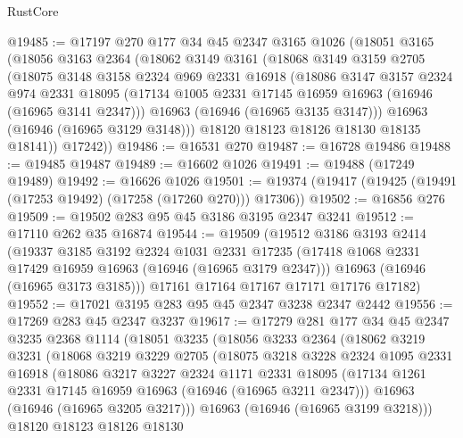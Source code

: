 \begin{lexlean}{RustCore}
\begin{coremodule}
@19485 := @17197
    @270
    @177
    @34
    @45
    @2347
    @3165
    @1026
    (@18051
      @3165
      (@18056
        @3163
        @2364
        (@18062
          @3149
          @3161
          (@18068
            @3149
            @3159
            @2705
            (@18075
              @3148
              @3158
              @2324
              @969
              @2331
              @16918
              (@18086
                @3147
                @3157
                @2324
                @974
                @2331
                @18095
                (@17134 @1005 @2331 @17145 @16959 @16963 (@16946 (@16965 @3141 @2347)))
                @16963
                (@16946 (@16965 @3135 @3147)))
              @16963
              (@16946 (@16965 @3129 @3148)))
            @18120
            @18123
            @18126
            @18130
            @18135
            @18141))
        @17242))
@19486 := @16531 @270
@19487 := @16728 @19486
@19488 := @19485 @19487
@19489 := @16602 @1026
@19491 := @19488 (@17249 @19489)
@19492 := @16626 @1026
@19501 := @19374 (@19417 (@19425 (@19491 (@17253 @19492) (@17258 (@17260 @270))) @17306))
@19502 := @16856 @276
@19509 := @19502 @283 @95 @45 @3186 @3195 @2347 @3241
@19512 := @17110 @262 @35 @16874
@19544 := @19509
    (@19512
      @3186
      @3193
      @2414
      (@19337
        @3185
        @3192
        @2324
        @1031
        @2331
        @17235
        (@17418 @1068 @2331 @17429 @16959 @16963 (@16946 (@16965 @3179 @2347)))
        @16963
        (@16946 (@16965 @3173 @3185)))
      @17161
      @17164
      @17167
      @17171
      @17176
      @17182)
@19552 := @17021 @3195 @283 @95 @45 @2347 @3238 @2347 @2442
@19556 := @17269 @283 @45 @2347 @3237
@19617 := @17279
    @281
    @177
    @34
    @45
    @2347
    @3235
    @2368
    @1114
    (@18051
      @3235
      (@18056
        @3233
        @2364
        (@18062
          @3219
          @3231
          (@18068
            @3219
            @3229
            @2705
            (@18075
              @3218
              @3228
              @2324
              @1095
              @2331
              @16918
              (@18086
                @3217
                @3227
                @2324
                @1171
                @2331
                @18095
                (@17134 @1261 @2331 @17145 @16959 @16963 (@16946 (@16965 @3211 @2347)))
                @16963
                (@16946 (@16965 @3205 @3217)))
              @16963
              (@16946 (@16965 @3199 @3218)))
            @18120
            @18123
            @18126
            @18130

\end{coremodule}
\end{lexlean}

